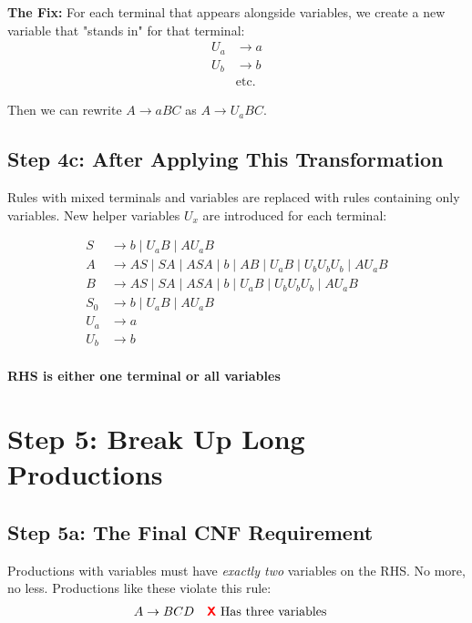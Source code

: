 \documentclass{article}
\begin{document}
\noindent\textbf{The Fix:} For each terminal that appears alongside variables, we create a new variable that "stands in" for that terminal:
\begin{align*}
    U_a &\to a \\
    U_b &\to b \\
    &\text{etc.}
\end{align*}

Then we can rewrite $A \to aBC$ as $A \to U_a BC$.

\subsection{Step 4c: After Applying This Transformation}

Rules with mixed terminals and variables are replaced with rules containing only variables. New helper variables $U_x$ are introduced for each terminal:

\begin{align*}
    S &\to b
         \mid U_aB
         \mid AU_aB
        \\
    A &\to AS
         \mid SA
         \mid ASA
         \mid b
         \mid AB
         \mid U_aB
         \mid U_bU_bU_b
         \mid AU_aB
        \\
    B &\to AS
         \mid SA
         \mid ASA
         \mid b
         \mid U_aB
         \mid U_bU_bU_b
         \mid AU_aB
        \\
    S_0 &\to b
         \mid U_aB
         \mid AU_aB
        \\
    U_{a} &\to a
        \\
    U_{b} &\to b
        \\
    \end{align*}

\vspace{0.2cm}
\noindent\textcolor{green!60!black}{\textbf{ RHS is either one terminal or all variables}}

\section{Step 5: Break Up Long Productions}

\subsection{Step 5a: The Final CNF Requirement}

Productions with variables must have \textit{exactly two} variables on the RHS. No more, no less. Productions like these violate this rule:
\begin{align*}
    A &\to BCD \quad \textcolor{red}{\textbf{\textsf{X}}} \text{ Has three variables}
\end{align*}
\end{document}
